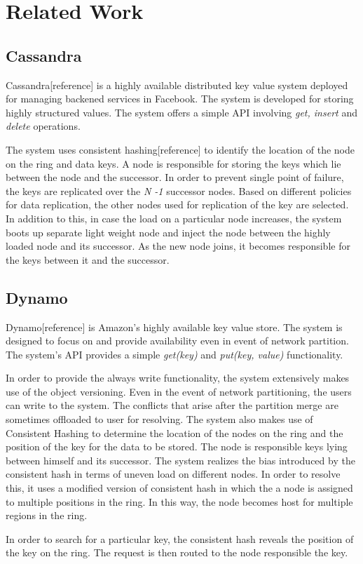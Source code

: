 \documentclass[12pt,a4paper,twoside,openright]{book}
\begin{document}
\chapter{Related Work}
\label{sec:related_work}



\section{Cassandra}
Cassandra[reference] is a highly available distributed key value system deployed for managing backened services in Facebook. The system is developed for storing highly structured values. The system offers a simple API involving \textit{get, insert} and \textit{delete} operations.
\par The system uses consistent hashing[reference] to identify the location of the node on the ring and data keys. A node is responsible for storing the keys which lie between the node and the successor. In order to prevent single point of failure, the keys are replicated over the \textit{N -1} successor nodes. Based on different policies for data replication, the other nodes used for replication of the key are selected. In addition to this, in case the load on a particular node increases, the system boots up separate light weight node and inject the node between the highly loaded node and its successor. As the new node joins, it becomes responsible for the keys between it and the successor.

\section{Dynamo}
Dynamo[reference] is Amazon's highly available key value store. The system is designed to focus on and provide availability even in event of network partition. The system's API provides a simple \textit{get(key)} and \textit{put(key, value)} functionality. 

\par In order to provide the always write functionality, the system extensively makes use of the object versioning. Even in the event of network partitioning, the users can write to the system. The conflicts that arise after the partition merge are sometimes offloaded to user for resolving. The system also makes use of Consistent Hashing to determine the location of the nodes on the ring and the position of the key for the data to be stored. The node is responsible keys lying between himself and its successor. The system realizes the bias introduced by the consistent hash in terms of uneven load on different nodes. In order to resolve this, it uses a modified version of consistent hash in which the a node is assigned to multiple positions in the ring. In this way, the node becomes host for multiple regions in the ring.
\par In order to search for a particular key, the consistent hash reveals the position of the key on the ring. The request is then routed to the node responsible the key. 
\end{document}
